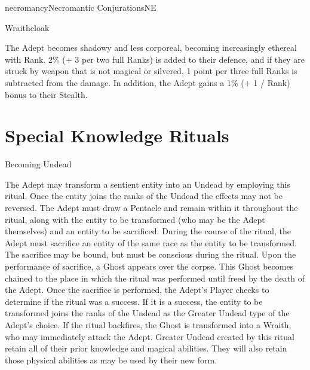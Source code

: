\begin{College}[1.1]{necromancy}{Necromantic Conjurations}{NE}
\begin{spell}[S-16]{Wraithcloak}
\begin{effects}
The Adept becomes shadowy and less corporeal, becoming increasingly
ethereal with Rank. 2\% (+ 3 per two full Ranks) is added to their
defence, and if they are struck by weapon that is not magical or
silvered, 1 point per three full Ranks is subtracted from the damage.
In addition, the Adept gains a 1\% (+ 1 / Rank) bonus to their
Stealth.
\end{effects}
\end{spell}

\section{Special Knowledge Rituals}

\begin{ritual}[R-1]{Becoming Undead}

\begin{effects}
The Adept may transform a sentient entity into an Undead by employing
this ritual. Once the entity joins the ranks of the Undead the effects
may not be reversed.  The Adept must draw a Pentacle and remain within
it throughout the ritual, along with the entity to be transformed (who
may be the Adept themselves) and an entity to be sacrificed.  During
the course of the ritual, the Adept must sacrifice an entity of the
same race as the entity to be transformed.  The sacrifice may be
bound, but must be conscious during the ritual.  Upon the performance
of sacrifice, a Ghost appears over the corpse. This Ghost becomes
chained to the place in which the ritual was performed until freed by
the death of the Adept.  Once the sacrifice is performed, the Adept’s
Player checks to determine if the ritual was a success. If it is a
success, the entity to be transformed joins the ranks of the Undead as
the Greater Undead type of the Adept’s choice.  If the ritual
backfires, the Ghost is transformed into a Wraith, who may immediately
attack the Adept.  Greater Undead created by this ritual retain all of
their prior knowledge and magical abilities.  They will also retain
those physical abilities as may be used by their new form.
\end{effects}
\end{ritual}


\end{College}
